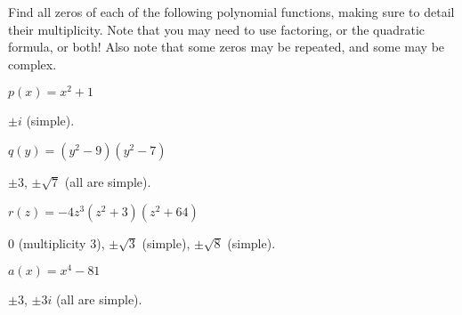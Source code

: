 \begin{exercises}
\begin{problem}
\begin{subproblem}
\begin{shortsolution}
		 \end{shortsolution}
	 \end{subproblem}
	 \end{problem}
	 \begin{problem}[Zeros]
	 Find all zeros of each of the following polynomial functions, making
	 sure to detail their multiplicity. Note that
	 you may need to use factoring, or the quadratic formula, or both! Also note
	 that some zeros may be repeated, and some may be complex.
	 \begin{multicols}{3}
		 \begin{subproblem}
			 $p(x)=x^2+1$
			 \begin{shortsolution}
				 $\pm i$ (simple).
			 \end{shortsolution}
		 \end{subproblem}
		 \begin{subproblem}
			 $q(y)=(y^2-9)(y^2-7)$
			 \begin{shortsolution}
				 $\pm 3$, $\pm \sqrt{7}$ (all are simple).
			 \end{shortsolution}
		 \end{subproblem}
		 \begin{subproblem}
			 $r(z)=-4z^3(z^2+3)(z^2+64)$
			 \begin{shortsolution}
				 $0$ (multiplicity $3$), $\pm\sqrt{3}$ (simple), $\pm\sqrt{8}$ (simple).
			 \end{shortsolution}
		 \end{subproblem}
		 \begin{subproblem}
			 $a(x)=x^4-81$
			 \begin{shortsolution}
				 $\pm 3$, $\pm 3i$ (all are simple).
			 \end{shortsolution}
		 \end{subproblem}
		 \begin{subproblem}

\end{subproblem}
\end{multicols}
\end{problem}
\end{exercises}
